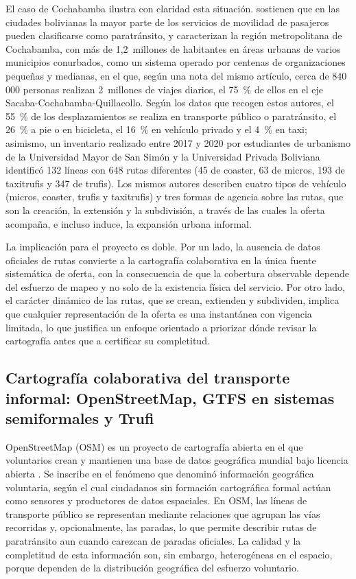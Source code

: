 El caso de Cochabamba ilustra con claridad esta situación. \textcite{cabrera2022} sostienen
que en las ciudades bolivianas la mayor parte de los servicios de movilidad de pasajeros
pueden clasificarse como paratránsito, y caracterizan la región metropolitana de Cochabamba,
con más de 1,2~millones de habitantes en áreas urbanas de varios municipios conurbados, como
un sistema operado por centenas de organizaciones pequeñas y medianas, en el que, según una
nota del mismo artículo, cerca de 840\,000 personas realizan 2~millones de viajes diarios,
el 75~\% de ellos en el eje Sacaba-Cochabamba-Quillacollo. Según los datos que recogen estos
autores, el 55~\% de los desplazamientos se realiza en transporte público o paratránsito, el
26~\% a pie o en bicicleta, el 16~\% en vehículo privado y el 4~\% en taxi; asimismo, un
inventario realizado entre 2017 y 2020 por estudiantes de urbanismo de la Universidad Mayor
de San Simón y la Universidad Privada Boliviana identificó 132 líneas con 648 rutas
diferentes (45 de coaster, 63 de micros, 193 de taxitrufis y 347 de trufis). Los mismos
autores describen cuatro tipos de vehículo (micros, coaster, trufis y taxitrufis) y tres
formas de agencia sobre las rutas, que son la creación, la extensión y la subdivisión, a
través de las cuales la oferta acompaña, e incluso induce, la expansión urbana informal.

La implicación para el proyecto es doble. Por un lado, la ausencia de datos oficiales de
rutas convierte a la cartografía colaborativa en la única fuente sistemática de oferta, con
la consecuencia de que la cobertura observable depende del esfuerzo de mapeo y no solo de la
existencia física del servicio. Por otro lado, el carácter dinámico de las rutas, que se
crean, extienden y subdividen, implica que cualquier representación de la oferta es una
instantánea con vigencia limitada, lo que justifica un enfoque orientado a priorizar dónde
revisar la cartografía antes que a certificar su completitud.

\subsection{Cartografía colaborativa del transporte informal: OpenStreetMap, GTFS en sistemas semiformales y Trufi}
\label{subsec:cartografia-colaborativa}

OpenStreetMap (OSM) es un proyecto de cartografía abierta en el que voluntarios crean y
mantienen una base de datos geográfica mundial bajo licencia abierta \parencite{haklay2008}.
Se inscribe en el fenómeno que \textcite{goodchild2007} denominó información geográfica
voluntaria, según el cual ciudadanos sin formación cartográfica formal actúan como sensores
y productores de datos espaciales. En OSM, las líneas de transporte público se representan
mediante relaciones que agrupan las vías recorridas y, opcionalmente, las paradas, lo que
permite describir rutas de paratránsito aun cuando carezcan de paradas oficiales. La calidad
y la completitud de esta información son, sin embargo, heterogéneas en el espacio, porque
dependen de la distribución geográfica del esfuerzo voluntario.

